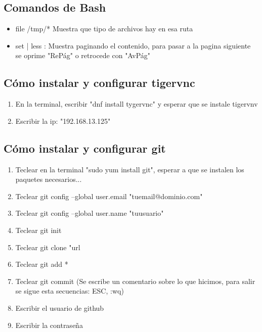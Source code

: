 \documentclass{book}
\begin{document}
	\subsection {Comandos de Bash}%
	\begin{itemize}%
		\item file /tmp/* Muestra que tipo de archivos hay en esa ruta
		\item set | less : Muestra paginando el contenido, para pasar a la pagina siguiente se oprime "RePág" o retrocede con "AvPág"
		
		
	\end{itemize}%
	\subsection {Cómo instalar y configurar tigervnc}
	\begin{enumerate}
		\item En la terminal, escribir "dnf install tygervnc" y esperar que se instale tigervnv
		\item Escribir la ip: "192.168.13.125"
	\end{enumerate}
	\subsection {Cómo instalar y configurar git}
	\begin{enumerate}
		\item Teclear en la terminal "sudo yum install git", esperar a que se instalen los paquetes necesarios...
		\item Teclear  git config --global user.email "tuemail@dominio.com"
		\item Teclear  git config --global user.name "tuusuario"      
		\item Teclear  git init
		\item Teclear  git clone "url
		\item Teclear git add *
		\item Teclear git commit (Se escribe un comentario sobre lo que hicimos, para salir se sigue esta secuencias: ESC, :wq)
		\item Escribir el usuario de github
		\item Escribir la contraseña
	\end{enumerate}
	
	
	
\end{document}
